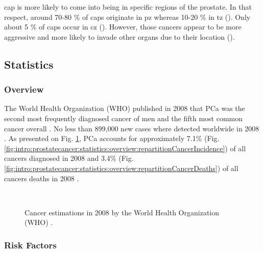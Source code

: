 \ac{cap} is more likely to come into being in specific regions of the prostate. In that respect, around 70-80 \% of \acp{cap} originate in \ac{pz} whereas 10-20 \% in \ac{tz} (\cite{Carrol1987,McNeal1988,Stamey1998}). Only about 5 \% of \acp{cap} occur in \ac{cz} (\cite{McNeal1988,Cohen2008}). However, those cancers appear to be more aggressive and more likely to invade other organs due to their location (\cite{Cohen2008}).


\subsection{Statistics}\label{subsection:intro:prostatecancer:statistics}

\subsubsection{Overview}\label{subsubsection:intro:prostatecancer:statistics:overview}

The World Health Organization (WHO) published in 2008 that PCa was the second most frequently diagnosed cancer of men and the fifth most common cancer overall \cite{Ferlay2010}. No less than 899,000 new cases where detected worldwide in 2008 \cite{Ferlay2010}. As presented on Fig. \ref{fig:intro:prostatecancer:statistics:overview:repartitionCancer}, PCa accounts for approximately 7.1\% (Fig. \ref{fig:intro:prostatecancer:statistics:overview:repartitionCancerIncidence}) of all cancers diagnosed in 2008 and 3.4\% (Fig. \ref{fig:intro:prostatecancer:statistics:overview:repartitionCancerDeaths}) of all cancers deaths in 2008 \cite{Ferlay2010}.

\begin{figure}
	\centering
	~
	\caption{Cancer estimations in 2008 by the World Health Organization (WHO) \cite{Ferlay2010}.}
	\label{fig:intro:prostatecancer:statistics:overview:repartitionCancer}
\end{figure}

\subsubsection{Risk Factors}\label{subsubsection:intro:prostatecancer:statistics:riskfactors}

